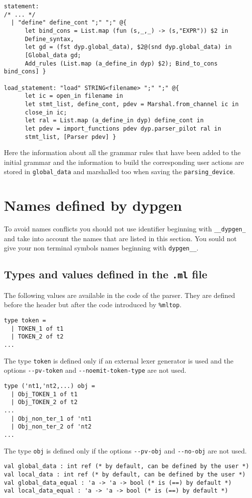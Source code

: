 \documentclass[12pt]{article}
\begin{document}
{\begin{verbatim}
statement:
/* ... */
  | "define" define_cont ";" ";" @{
      let bind_cons = List.map (fun (s,_,_) -> (s,"EXPR")) $2 in
      Define_syntax,
      let gd = (fst dyp.global_data), $2@(snd dyp.global_data) in
      [Global_data gd;
      Add_rules (List.map (a_define_in dyp) $2); Bind_to_cons bind_cons] }

load_statement: "load" STRING<filename> ";" ";" @{
      let ic = open_in filename in
      let stmt_list, define_cont, pdev = Marshal.from_channel ic in
      close_in ic;
      let ral = List.map (a_define_in dyp) define_cont in
      let pdev = import_functions pdev dyp.parser_pilot ral in
      stmt_list, [Parser pdev] }
\end{verbatim}
Here the information about all the grammar rules that have been added to the initial grammar and the information to build the corresponding user actions are stored in \verb|global_data| and marshalled too when saving the \verb|parsing_device|.

\section{Names defined by dypgen}

To avoid names conflicts you should not use identifier beginning with \verb|__dypgen_| and take into account the names that are listed in this section. You sould not give your non terminal symbols names beginning with \verb|dypgen__|.\\

\subsection{Types and values defined in the \texttt{.ml} file}

The following values are available in the code of the parser. They are defined before the header but after the code introduced by \verb|%mltop|.
\begin{verbatim}
type token =
  | TOKEN_1 of t1
  | TOKEN_2 of t2
...
\end{verbatim}
The type \verb|token| is defined only if an external lexer generator is used and the options \verb|--pv-token| and \verb|--noemit-token-type| are not used.
\begin{verbatim}
type ('nt1,'nt2,...) obj =
  | Obj_TOKEN_1 of t1
  | Obj_TOKEN_2 of t2
...
  | Obj_non_ter_1 of 'nt1
  | Obj_non_ter_2 of 'nt2
...
\end{verbatim}
The type \verb|obj| is defined only if the options \verb|--pv-obj| and \verb|--no-obj| are not used.
\begin{verbatim}
val global_data : int ref (* by default, can be defined by the user *)
val local_data : int ref (* by default, can be defined by the user *)
val global_data_equal : 'a -> 'a -> bool (* is (==) by default *)
val local_data_equal : 'a -> 'a -> bool (* is (==) by default *)


\end{verbatim}}
\end{document}
